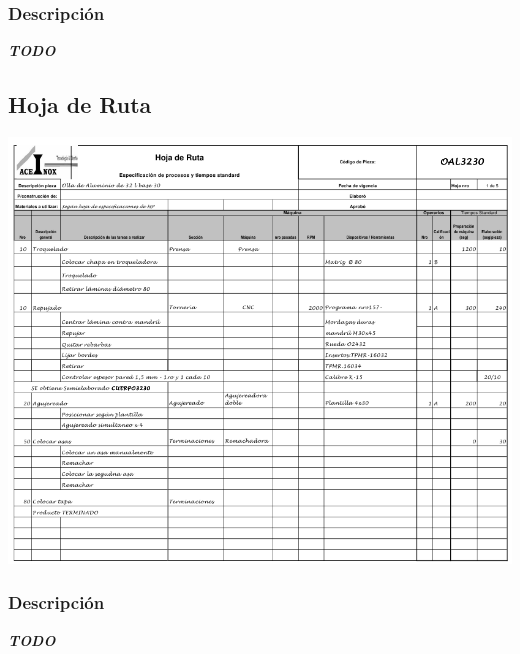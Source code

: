 \subsubsection{Descripción}
\emph{\textbf{TODO}}

\pagebreak
\subsection{Hoja de Ruta}
\begin{center}
 \includegraphics[angle=90,scale=0.95,keepaspectratio=true]{./Circuitos-Teoricos/Produccion/Images/hoja-de-ruta.png}
\end{center}

\subsubsection{Descripción}
\emph{\textbf{TODO}}

\pagebreak
